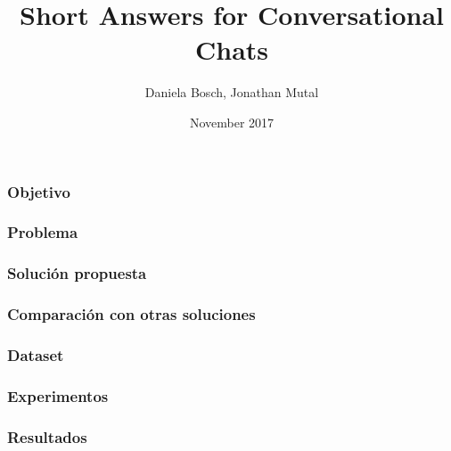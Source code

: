 \documentclass{beamer}
\title{Short Answers for Conversational Chats}
\author{Daniela Bosch, Jonathan Mutal}
\date{November 2017}
\begin{document}
  \begin{frame}
    \maketitle
  \end{frame}

  \begin{frame}
    \frametitle{Objetivo}
  \end{frame}

  \begin{frame}
    \frametitle{Problema}
  \end{frame}

  \begin{frame}
    \frametitle{Solución propuesta}
  \end{frame}

  \begin{frame}
    \frametitle{Comparación con otras soluciones}
  \end{frame}

  \begin{frame}
    \frametitle{Dataset}
  \end{frame}

  \begin{frame}
    \frametitle{Experimentos}
  \end{frame}

  \begin{frame}
    \frametitle{Resultados}
  \end{frame}
\end{document}
